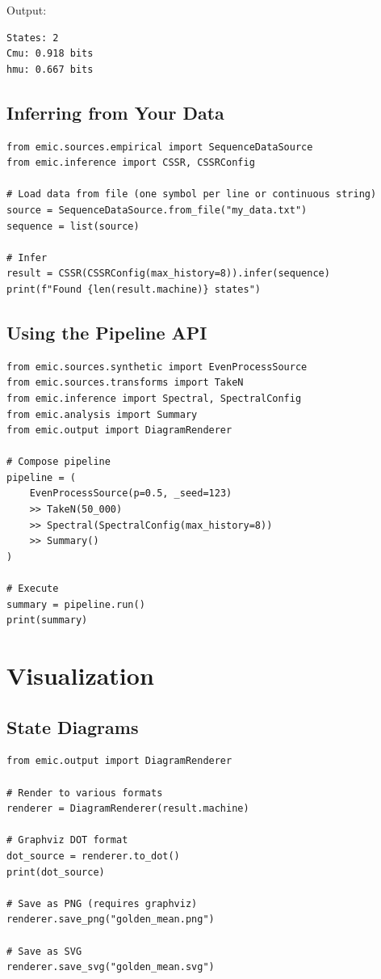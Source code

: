 \documentclass[11pt,a4paper]{report}
\theoremstyle{definition}
\theoremstyle{plain}
\begin{document}
Output:
\begin{lstlisting}
States: 2
Cmu: 0.918 bits
hmu: 0.667 bits
\end{lstlisting}

\subsection{Inferring from Your Data}

\begin{lstlisting}[caption={Inference from file data}]
from emic.sources.empirical import SequenceDataSource
from emic.inference import CSSR, CSSRConfig

# Load data from file (one symbol per line or continuous string)
source = SequenceDataSource.from_file("my_data.txt")
sequence = list(source)

# Infer
result = CSSR(CSSRConfig(max_history=8)).infer(sequence)
print(f"Found {len(result.machine)} states")
\end{lstlisting}

\subsection{Using the Pipeline API}

\begin{lstlisting}[caption={Pipeline composition}]
from emic.sources.synthetic import EvenProcessSource
from emic.sources.transforms import TakeN
from emic.inference import Spectral, SpectralConfig
from emic.analysis import Summary
from emic.output import DiagramRenderer

# Compose pipeline
pipeline = (
    EvenProcessSource(p=0.5, _seed=123)
    >> TakeN(50_000)
    >> Spectral(SpectralConfig(max_history=8))
    >> Summary()
)

# Execute
summary = pipeline.run()
print(summary)
\end{lstlisting}

\section{Visualization}

\subsection{State Diagrams}

\begin{lstlisting}[caption={Generating state diagrams}]
from emic.output import DiagramRenderer

# Render to various formats
renderer = DiagramRenderer(result.machine)

# Graphviz DOT format
dot_source = renderer.to_dot()
print(dot_source)

# Save as PNG (requires graphviz)
renderer.save_png("golden_mean.png")

# Save as SVG
renderer.save_svg("golden_mean.svg")
\end{lstlisting}
\end{document}
